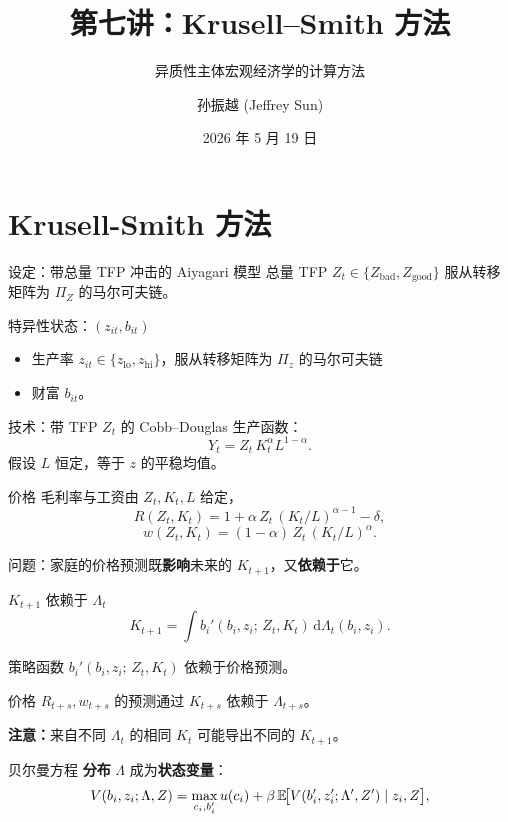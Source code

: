 \documentclass[10pt,aspectratio=169]{beamer}
\title{第七讲：Krusell--Smith 方法}
\subtitle{异质性主体宏观经济学的计算方法}
\author{孙振越 (Jeffrey Sun)}
\institute{多伦多大学}
\date{2026 年 5 月 19 日}
\begin{document}
\maketitle

\section{Krusell-Smith 方法}

\begin{frame}{设定：带总量 TFP 冲击的 Aiyagari 模型}
  总量 TFP $Z_t \in \{Z_{\text{bad}}, Z_{\text{good}}\}$ 服从转移矩阵为 $\Pi_Z$ 的马尔可夫链。

  特异性状态：$(z_{it}, b_{it})$
  \begin{itemize}
    \item 生产率 $z_{it} \in \{z_{\text{lo}}, z_{\text{hi}}\}$，服从转移矩阵为 $\Pi_z$ 的马尔可夫链
    \item 财富 $b_{it}$。
  \end{itemize}

  技术：带 TFP $Z_t$ 的 Cobb--Douglas 生产函数：
  \[
    Y_t = Z_t\, K_t^{\alpha} L^{1-\alpha}.
  \]
  假设 $L$ 恒定，等于 $z$ 的平稳均值。
\end{frame}

\begin{frame}{价格}
  毛利率与工资由 $Z_t, K_t, L$ 给定，
  \[
    R(Z_t, K_t) = 1 + \alpha\, Z_t\, (K_t/L)^{\alpha-1} - \delta,
  \]
  \[
    w(Z_t, K_t) = (1-\alpha)\, Z_t\, (K_t/L)^{\alpha}.
  \]

  问题：家庭的价格预测既\textbf{影响}未来的 $K_{t+1}$，又\textbf{依赖于}它。
\end{frame}

\begin{frame}{$K_{t+1}$ 依赖于 $\Lambda_t$}
  \[
    K_{t+1} = \int b_i'(b_i, z_i;\, Z_t, K_t)\, \mathrm d\Lambda_t(b_i, z_i).
  \]

  策略函数 $b_i'(b_i, z_i;\, Z_t, K_t)$ 依赖于价格预测。

  价格 $R_{t+s}, w_{t+s}$ 的预测通过 $K_{t+s}$ 依赖于 $\Lambda_{t+s}$。

  \textbf{注意：}来自不同 $\Lambda_t$ 的相同 $K_t$ 可能导出不同的 $K_{t+1}$。
\end{frame}

\begin{frame}{贝尔曼方程}
  \textbf{分布} $\Lambda$ 成为\textbf{状态变量}：
  \[
    V(b_i, z_i; \Lambda, Z) = \max_{c_i, b_i'} u(c_i) + \beta\, \mathbb{E}\!\bigl[V(b_i', z_i'; \Lambda', Z') \mid z_i, Z\bigr],
  \]
\end{frame}
\end{document}
